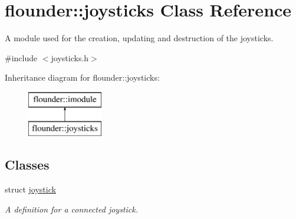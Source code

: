 \hypertarget{classflounder_1_1joysticks}{}\section{flounder\+:\+:joysticks Class Reference}
\label{classflounder_1_1joysticks}


A module used for the creation, updating and destruction of the joysticks.  




{\ttfamily \#include $<$joysticks.\+h$>$}

Inheritance diagram for flounder\+:\+:joysticks\+:\begin{figure}[H]
\begin{center}
\leavevmode
\includegraphics[height=2.000000cm]{classflounder_1_1joysticks}
\end{center}
\end{figure}
\subsection*{Classes}
\begin{DoxyCompactItemize}
\item 
struct \hyperlink{structflounder_1_1joysticks_1_1joystick}{joystick}
\begin{DoxyCompactList}\small\item\em A definition for a connected joystick. \end{DoxyCompactList}\end{DoxyCompactItemize}
